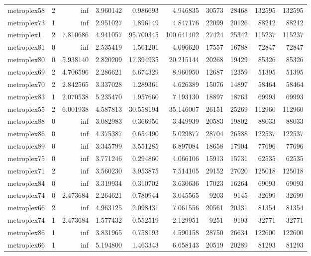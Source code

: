 \begin{longtable}{|l|r|r|r|r|r|r|r|r|r|}
metroplex58 & 2 & inf & 3.960142 & 0.986693 & 4.946835 & 30573 & 28468 & 132595 & 132595 \\
metroplex73 & 1 & inf & 2.951027 & 1.896149 & 4.847176 & 22099 & 20126 & 88212 & 88212 \\
metroplex1 & 2 & 7.810686 & 4.941057 & 95.700345 & 100.641402 & 27424 & 25342 & 115237 & 115237 \\
metroplex81 & 0 & inf & 2.535419 & 1.561201 & 4.096620 & 17557 & 16788 & 72847 & 72847 \\
metroplex80 & 0 & 5.938140 & 2.820209 & 17.394935 & 20.215144 & 20268 & 19429 & 85326 & 85326 \\
metroplex69 & 2 & 4.706596 & 2.286621 & 6.674329 & 8.960950 & 12687 & 12359 & 51395 & 51395 \\
metroplex70 & 2 & 2.842565 & 3.337028 & 1.289361 & 4.626389 & 15076 & 14897 & 58464 & 58464 \\
metroplex83 & 1 & 2.070538 & 5.235470 & 1.957660 & 7.193130 & 18897 & 18763 & 69993 & 69993 \\
metroplex55 & 2 & 6.001938 & 4.587813 & 30.558194 & 35.146007 & 26151 & 25269 & 112960 & 112960 \\
metroplex88 & 0 & inf & 3.082983 & 0.366956 & 3.449939 & 20583 & 19802 & 88033 & 88033 \\
metroplex86 & 0 & inf & 4.375387 & 0.654490 & 5.029877 & 28704 & 26588 & 122537 & 122537 \\
metroplex89 & 0 & inf & 3.345799 & 3.551285 & 6.897084 & 18658 & 17904 & 77696 & 77696 \\
metroplex75 & 0 & inf & 3.771246 & 0.294860 & 4.066106 & 15913 & 15731 & 62535 & 62535 \\
metroplex71 & 2 & inf & 3.560230 & 3.953875 & 7.514105 & 29152 & 27020 & 125018 & 125018 \\
metroplex84 & 0 & inf & 3.319934 & 0.310702 & 3.630636 & 17023 & 16264 & 69093 & 69093 \\
metroplex74 & 0 & 2.473684 & 2.264621 & 0.780944 & 3.045565 & 9203 & 9145 & 32699 & 32699 \\
metroplex66 & 2 & inf & 4.963125 & 2.098431 & 7.061556 & 20561 & 20331 & 81354 & 81354 \\
metroplex74 & 1 & 2.473684 & 1.577432 & 0.552519 & 2.129951 & 9251 & 9193 & 32771 & 32771 \\
metroplex86 & 1 & inf & 3.831965 & 0.758193 & 4.590158 & 28750 & 26634 & 122600 & 122600 \\
metroplex66 & 1 & inf & 5.194800 & 1.463343 & 6.658143 & 20519 & 20289 & 81293 & 81293 \\

\end{longtable}
